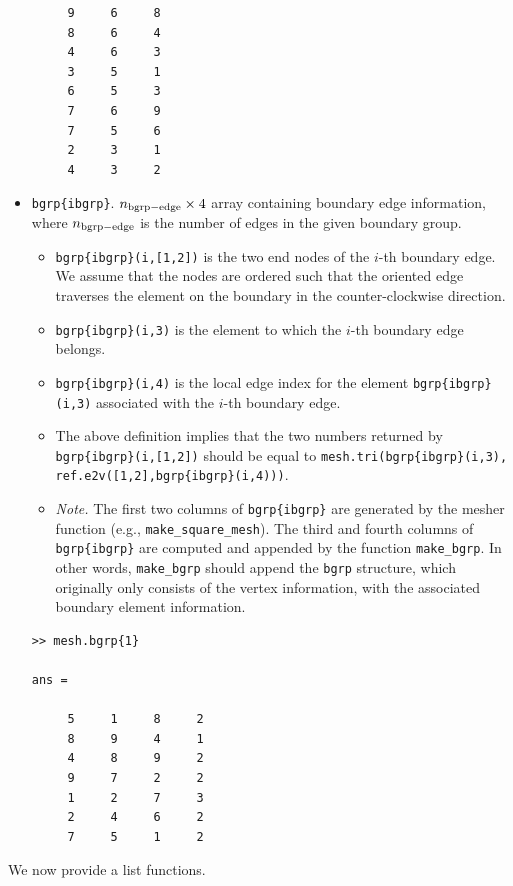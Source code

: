 \documentclass[openany,preprint,11pt]{article}
\begin{document}
\begin{itemize}
\begin{verbatim}
     9     6     8
     8     6     4
     4     6     3
     3     5     1
     6     5     3
     7     6     9
     7     5     6
     2     3     1
     4     3     2
\end{verbatim}
\item \texttt{bgrp\{ibgrp\}}. $n_{\rm bgrp-edge} \times 4$ array containing boundary edge information, where $n_{\rm bgrp-edge}$ is the number of edges in the given boundary group.
  \begin{itemize}
  \item \texttt{bgrp\{ibgrp\}(i,[1,2])} is the two end nodes of the $i$-th boundary edge. We assume that the nodes are ordered such that the oriented edge traverses the element on the boundary in the counter-clockwise direction.
  \item \texttt{bgrp\{ibgrp\}(i,3)} is the element to which the $i$-th boundary edge belongs.
  \item \texttt{bgrp\{ibgrp\}(i,4)} is the local edge index for the element \texttt{bgrp\{ibgrp\}(i,3)} associated with the $i$-th boundary edge.
  \item The above definition implies that the two numbers returned by \texttt{bgrp\{ibgrp\}(i,[1,2])} should be equal to \texttt{mesh.tri(bgrp\{ibgrp\}(i,3), ref.e2v([1,2],bgrp\{ibgrp\}(i,4)))}.
  \item \emph{Note.} The first two columns of \texttt{bgrp\{ibgrp\}} are generated by the mesher function (e.g., \texttt{make\_square\_mesh}).  The third and fourth columns of \texttt{bgrp\{ibgrp\}} are computed and appended by the function \texttt{make\_bgrp}. In other words, \texttt{make\_bgrp} should append the \texttt{bgrp} structure, which originally only consists of the vertex information, with the associated boundary element information.
  \end{itemize}
\begin{verbatim}
>> mesh.bgrp{1}
   
ans =

     5     1     8     2
     8     9     4     1
     4     8     9     2
     9     7     2     2
     1     2     7     3
     2     4     6     2
     7     5     1     2
\end{verbatim}
\end{itemize}
We now provide a list functions.
\end{document}

